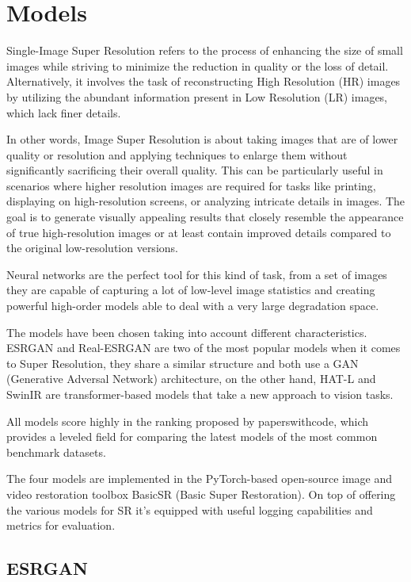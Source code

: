 \chapter{Models}
\label{cha:models}

Single-Image Super Resolution refers to the process of enhancing the size of small images while striving to minimize the reduction in quality or the loss of detail. Alternatively, it involves the task of reconstructing High Resolution (HR) images by utilizing the abundant information present in Low Resolution (LR) images, which lack finer details.

In other words, Image Super Resolution is about taking images that are of lower quality or resolution and applying techniques to enlarge them without significantly sacrificing their overall quality. This can be particularly useful in scenarios where higher resolution images are required for tasks like printing, displaying on high-resolution screens, or analyzing intricate details in images. The goal is to generate visually appealing results that closely resemble the appearance of true high-resolution images or at least contain improved details compared to the original low-resolution versions.

Neural networks are the perfect tool for this kind of task, from a set of images they are capable of capturing a lot of low-level image statistics and creating powerful high-order models able to deal with a very large degradation space.

The models have been chosen taking into account different characteristics. ESRGAN and Real-ESRGAN are two of the most popular models when it comes to Super Resolution, they share a similar structure and both use a GAN (Generative Adversal Network) architecture, on the other hand, HAT-L and SwinIR are transformer-based models that take a new approach to vision tasks.

All models score highly in the ranking proposed by paperswithcode\cite{pwcode}, which provides a leveled field for comparing the latest models of the most common benchmark datasets.

The four models are implemented in the PyTorch-based open-source image and video restoration toolbox BasicSR (Basic Super Restoration). On top of offering the various models for SR it's equipped with useful logging capabilities and metrics for evaluation.


\section{ESRGAN}
\label{subsec:esrgan}

